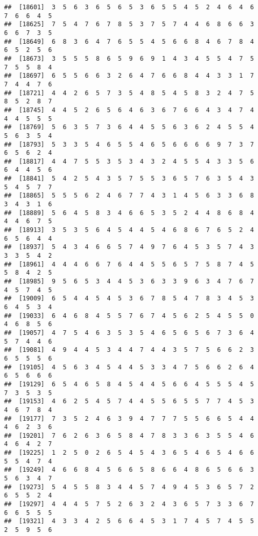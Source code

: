\documentclass[
]{book}
\begin{document}
\begin{verbatim}
##  [18601]  3  5  6  3  6  5  6  5  3  6  5  5  4  5  2  4  6  4  6  7  6  6  4  5
##  [18625]  7  5  4  7  6  7  8  5  3  7  5  7  4  4  6  8  6  6  3  6  6  7  3  5
##  [18649]  6  8  3  6  4  7  6  5  5  4  5  6  6  8  4  6  7  8  4  6  5  2  5  6
##  [18673]  3  5  5  5  8  6  5  9  6  9  1  4  3  4  5  5  4  7  5  7  5  5  8  4
##  [18697]  6  5  5  6  6  3  2  6  4  7  6  6  8  4  4  3  3  1  7  7  4  4  7  6
##  [18721]  4  4  2  6  5  7  3  5  4  8  5  4  5  8  3  2  4  7  5  8  5  2  8  7
##  [18745]  4  4  5  2  6  5  6  4  6  3  6  7  6  6  4  3  4  7  4  4  4  5  5  5
##  [18769]  5  6  3  5  7  3  6  4  4  5  5  6  3  6  2  4  5  5  4  5  6  3  5  4
##  [18793]  5  3  3  5  4  6  5  5  4  6  5  6  6  6  6  9  7  3  7  6  5  6  2  4
##  [18817]  4  4  7  5  5  3  5  3  4  3  2  4  5  5  4  3  3  5  6  6  4  4  5  6
##  [18841]  5  4  2  5  4  3  5  7  5  5  3  6  5  7  6  3  5  4  3  5  4  5  7  7
##  [18865]  5  5  5  6  2  4  6  7  7  4  3  1  4  5  6  3  3  6  8  3  4  3  1  6
##  [18889]  5  6  4  5  8  3  4  6  6  5  3  5  2  4  4  8  6  8  4  4  4  6  7  5
##  [18913]  3  5  3  5  6  4  5  4  4  5  4  6  8  6  7  6  5  2  4  6  5  6  4  4
##  [18937]  5  4  3  4  6  6  5  7  4  9  7  6  4  5  3  5  7  4  3  3  3  5  4  2
##  [18961]  4  4  4  6  6  7  6  4  4  5  5  6  5  7  5  8  7  4  5  5  8  4  2  5
##  [18985]  9  5  6  5  3  4  4  5  3  6  3  3  9  6  3  4  7  6  7  4  5  7  4  5
##  [19009]  6  5  4  4  5  4  5  3  6  7  8  5  4  7  8  3  4  5  3  6  4  5  3  4
##  [19033]  6  4  6  8  4  5  5  7  6  7  4  5  6  2  5  4  5  5  0  4  6  8  5  6
##  [19057]  4  7  5  4  6  3  5  3  5  4  6  5  6  5  6  7  3  6  4  5  7  4  4  6
##  [19081]  4  9  4  4  5  3  4  4  7  4  4  3  5  7  5  6  6  2  3  6  5  5  5  6
##  [19105]  4  5  6  3  4  5  4  4  5  3  3  4  7  5  6  6  2  6  4  6  5  6  6  6
##  [19129]  6  5  4  6  5  8  4  5  4  4  5  6  6  4  5  5  5  4  5  7  3  5  3  5
##  [19153]  4  6  2  5  4  5  7  4  4  5  5  6  5  5  7  7  4  5  3  4  6  7  8  4
##  [19177]  7  3  5  2  4  6  3  9  4  7  7  7  5  5  6  6  5  4  4  4  6  2  3  6
##  [19201]  7  6  2  6  3  6  5  8  4  7  8  3  3  6  3  5  5  4  6  4  6  4  2  7
##  [19225]  1  2  5  0  2  6  5  4  5  4  3  6  5  4  6  5  4  6  6  5  5  4  7  4
##  [19249]  4  6  6  8  4  5  6  6  5  8  6  6  4  8  6  5  6  6  3  5  6  3  4  7
##  [19273]  5  4  5  5  8  3  4  4  5  7  4  9  4  5  3  6  5  7  2  6  5  5  2  4
##  [19297]  4  4  4  5  7  5  2  6  3  2  4  3  6  5  7  3  3  6  7  6  6  5  5  5
##  [19321]  4  3  3  4  2  5  6  6  4  5  3  1  7  4  5  7  4  5  5  2  5  9  5  6

\end{verbatim}
\end{document}
